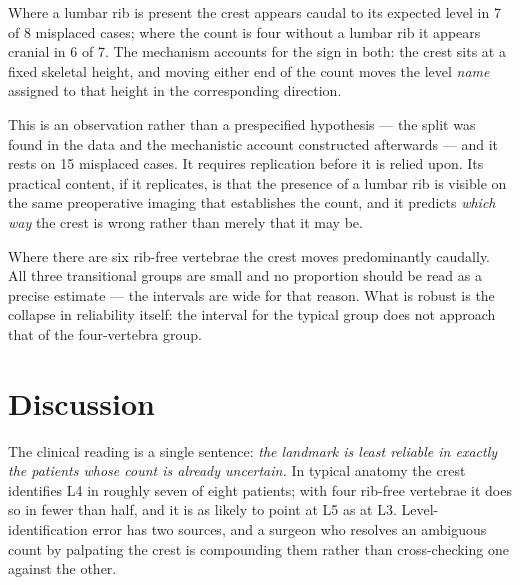 \documentclass[11pt,a4paper]{article}
\begin{document}
Where a lumbar rib is present the crest appears caudal to its expected level in 7 of 8
misplaced cases; where the count is four without a lumbar rib it appears cranial in 6 of
7. The mechanism accounts for the sign in both: the crest sits at a fixed skeletal
height, and moving either end of the count moves the level \emph{name} assigned to that
height in the corresponding direction.

This is an observation rather than a prespecified hypothesis --- the split was found in
the data and the mechanistic account constructed afterwards --- and it rests on 15
misplaced cases. It requires replication before it is relied upon. Its practical content,
if it replicates, is that the presence of a lumbar rib is visible on the same preoperative
imaging that establishes the count, and it predicts \emph{which way} the crest is wrong
rather than merely that it may be.

Where there are six rib-free vertebrae the crest moves predominantly caudally. All three
transitional groups are small and no proportion should be read as a precise estimate ---
the intervals are wide for that reason. What is robust is the collapse in reliability
itself: the interval for the typical group does not approach that of the four-vertebra
group.


\section{Discussion}

The clinical reading is a single sentence: \emph{the landmark is least reliable in exactly
the patients whose count is already uncertain.} In typical anatomy the crest identifies L4
in roughly seven of eight patients; with four rib-free vertebrae it does so in fewer than
half, and it is as likely to point at L5 as at L3. Level-identification error has two
sources, and a surgeon who resolves an ambiguous count by palpating the crest is
compounding them rather than cross-checking one against the other.

\end{document}
